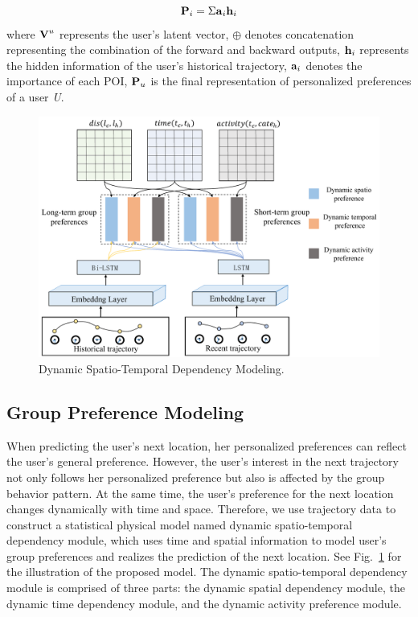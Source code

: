 \documentclass[10pt,journal,compsoc]{IEEEtran}
\begin{document}
\begin{equation}
    \bm{{\rm P}}_i = \Sigma{\bm{{\rm a}}_i \bm{{\rm h}}_i}
\end{equation}
where $\bm{{\rm V}}^u$ represents the user's latent vector, $\oplus{}$ denotes concatenation representing the combination of the forward and backward outputs, $\bm{{\rm h}}_i$ represents the hidden information of the user's historical trajectory, $\bm{{\rm a}}_i$ denotes the importance of each POI, $\bm{{\rm P}}_u$ is the final representation of personalized preferences of a user \textit{U}.

\begin{figure}[htpb]
    \centering
    \includegraphics[width=14cm]{figure/ST2.pdf}
    \caption{Dynamic Spatio-Temporal Dependency Modeling.}
    \label{fig.4}
\end{figure}

\subsection{Group Preference Modeling}

When predicting the user's next location, her personalized preferences can reflect the user's general preference. However, the user's interest in the next trajectory not only follows her personalized preference but also is affected by the group behavior pattern. At the same time, the user's preference for the next location changes dynamically with time and space. Therefore, we use trajectory data to construct a statistical physical model named dynamic spatio-temporal dependency module, which uses time and spatial information to model user's group preferences and realizes the prediction of the next location. See Fig.~\ref{fig.4} for the illustration of the proposed model. The dynamic spatio-temporal dependency module is comprised of three parts: the dynamic spatial dependency module, the dynamic time dependency module, and the dynamic activity preference module.
\end{document}
